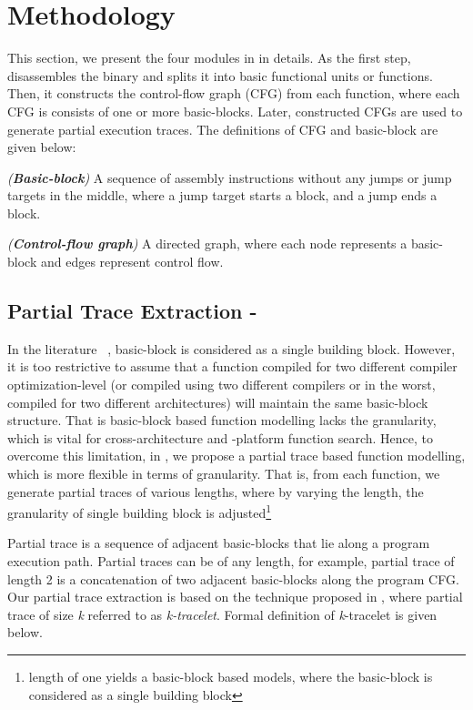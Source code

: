 \section{Methodology}\label{sec:methodology}
This section, we present the four modules in \tool in details.
As the first step, \tool disassembles the binary and splits it into basic functional units or functions. Then, it constructs the control-flow graph (CFG) from each function, where each CFG is consists of one or more basic-blocks. Later, constructed CFGs are used to generate partial execution traces. The definitions of CFG and basic-block are given below:

\begin{mydef}
\emph{(\textbf{Basic-block}) }  A sequence of assembly instructions without any jumps or jump targets in the middle, where a jump target starts a block, and a jump ends a block.
\end{mydef}
\begin{mydef}
\emph{(\textbf{Control-flow graph}) } A directed graph, where each node represents a basic-block and edges represent control flow.
\end{mydef}

\subsection{Partial Trace Extraction - } \label{subsec:partial_trace}

In the literature ~\cite{pewnycross,lakhotia2013fast,ruttenberg2014identifying}, basic-block is considered as a single building block. However, it is too restrictive to assume that a function compiled for two different compiler optimization-level (or compiled using two different compilers or in the worst, compiled for two different architectures) will maintain the same basic-block structure. That is basic-block based function modelling lacks the granularity, which is vital for cross-architecture and -platform function search. Hence, to overcome this limitation, in \tool, we propose a partial trace based function modelling, which is more flexible in terms of granularity. That is, from each function, we generate partial traces of various lengths, where by varying the length, the granularity of single building block is adjusted\footnote{length of one yields a basic-block based models, where the basic-block is considered as a single building block}


Partial trace is a sequence of adjacent basic-blocks that lie along a program execution path. Partial traces can be of any length, for example, partial trace of length 2 is a concatenation of two adjacent basic-blocks along the program CFG. Our partial trace extraction is based on the technique proposed in \cite{david2014tracelet}, where partial trace of size \textit{k} referred to as \textit{k-tracelet}. Formal definition of \textit{k}-tracelet \cite{david2014tracelet} is given below.

